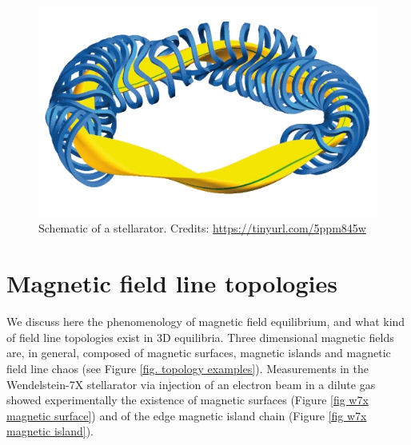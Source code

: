 \documentclass[my_thesis.tex]{subfiles}
\begin{document}
\begin{figure}
    \centering
    \includegraphics[width=\linewidth]{images/Introduction/StellaratorSketch.jpg}
    \caption{Schematic of a stellarator. Credits: \url{https://tinyurl.com/5ppm845w}}
    \label{fig stellarator sketch}
\end{figure}




\section{Magnetic field line topologies}

We discuss here the phenomenology of magnetic field equilibrium, and what kind of field line topologies exist in 3D equilibria. Three dimensional magnetic fields are, in general, composed of  magnetic surfaces, magnetic islands and magnetic field line chaos (see Figure \ref{fig. topology examples}). Measurements in the Wendelstein-7X stellarator via injection of an electron beam in a dilute gas \citep{pedersenConfirmationTopologyWendelstein2016} showed experimentally the existence of magnetic surfaces (Figure \ref{fig w7x magnetic surface}) and of the edge magnetic island chain (Figure \ref{fig w7x magnetic island}).
\end{document}
